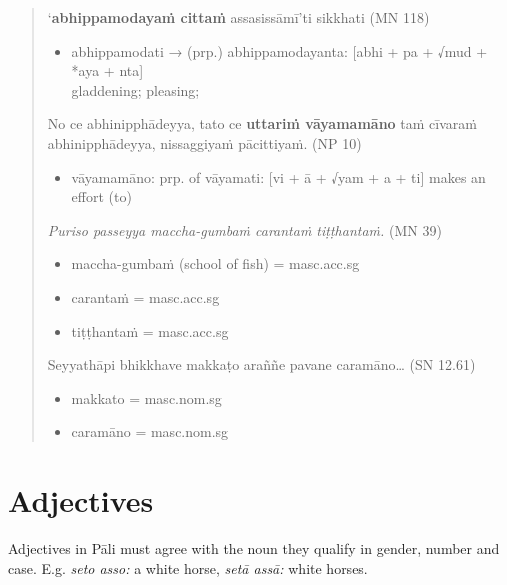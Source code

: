\documentclass[11pt,oneside]{memoir}
\begin{document}
\begin{quote}
`\textbf{abhippamodayaṁ cittaṁ} assasissāmī'ti sikkhati (MN 118)

\begin{itemize}
\item abhippamodati → (prp.) abhippamodayanta: [abhi + pa + √mud + *aya + nta] \\[0pt]
gladdening; pleasing;
\end{itemize}

No ce abhinipphādeyya, tato ce \textbf{uttariṁ vāyamamāno} taṁ cīvaraṁ abhinipphādeyya, nissaggiyaṁ pācittiyaṁ. (NP 10)

\begin{itemize}
\item vāyamamāno: prp. of vāyamati: [vi + ā + √yam + a + ti] makes an effort (to)
\end{itemize}

\clearpage

\emph{Puriso passeyya maccha-gumbaṁ carantaṁ tiṭṭhantaṁ.} (MN 39)

\begin{itemize}
\item maccha-gumbaṁ (school of fish) = masc.acc.sg
\item carantaṁ = masc.acc.sg
\item tiṭṭhantaṁ = masc.acc.sg
\end{itemize}


\bigskip

Seyyathāpi bhikkhave makkaṭo araññe pavane caramāno\ldots{} (SN 12.61)

\begin{itemize}
\item makkato = masc.nom.sg
\item caramāno = masc.nom.sg
\end{itemize}

\end{quote}

\section{Adjectives}
\label{sec:org39d3a20}

Adjectives in Pāli must agree with the noun they qualify in gender, number and case.
E.g. \emph{seto asso:} a white horse, \emph{setā assā:} white horses.
\end{document}
